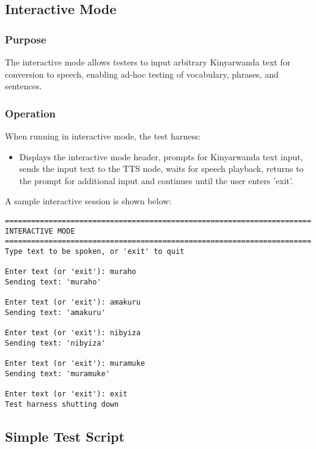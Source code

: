 \documentclass{CSSRforAfrica}
\begin{document}
\subsection{Interactive Mode}
\subsubsection{Purpose}
The interactive mode allows testers to input arbitrary Kinyarwanda text for conversion to speech, enabling ad-hoc testing of vocabulary, phrases, and sentences.

\subsubsection{Operation}
When running in interactive mode, the test harness:
\begin{itemize}
    \item Displays the interactive mode header, prompts for Kinyarwanda text input, sends the input text to the TTS node, waits for speech playback, returns to the prompt for additional input and continues until the user enters 'exit'.
\end{itemize}

A sample interactive session is shown below:

\begin{lstlisting}[style=commandstyle]
======================================================================
INTERACTIVE MODE
======================================================================
Type text to be spoken, or 'exit' to quit

Enter text (or 'exit'): muraho
Sending text: 'muraho'

Enter text (or 'exit'): amakuru
Sending text: 'amakuru'

Enter text (or 'exit'): nibyiza
Sending text: 'nibyiza'

Enter text (or 'exit'): muramuke
Sending text: 'muramuke'

Enter text (or 'exit'): exit
Test harness shutting down
\end{lstlisting}

\subsection{Simple Test Script}
\end{document}
